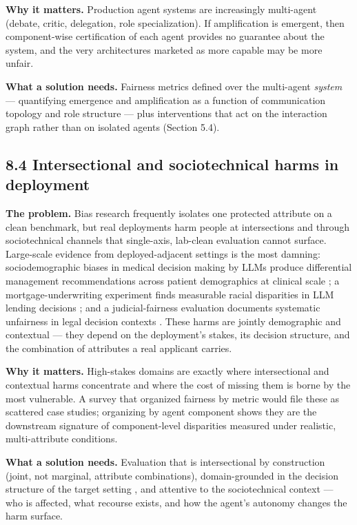 \documentclass[sigconf,nonacm]{acmart}
\begin{document}
\textbf{Why it matters.} Production agent systems are increasingly multi-agent (debate, critic, delegation, role specialization). If amplification is emergent, then component-wise certification of each agent provides no guarantee about the system, and the very architectures marketed as more capable may be more unfair.

\textbf{What a solution needs.} Fairness metrics defined over the multi-agent \emph{system} — quantifying emergence and amplification as a function of communication topology and role structure \cite{madigan2025emergent,nguyen2025social} — plus interventions that act on the interaction graph rather than on isolated agents (Section 5.4).

\subsection{8.4 Intersectional and sociotechnical harms in deployment}

\textbf{The problem.} Bias research frequently isolates one protected attribute on a clean benchmark, but real deployments harm people at intersections and through sociotechnical channels that single-axis, lab-clean evaluation cannot surface. Large-scale evidence from deployed-adjacent settings is the most damning: sociodemographic biases in medical decision making by LLMs produce differential management recommendations across patient demographics at clinical scale \cite{omar2025sociodemographic}; a mortgage-underwriting experiment finds measurable racial disparities in LLM lending decisions \cite{bowen2024measuring}; and a judicial-fairness evaluation documents systematic unfairness in legal decision contexts \cite{hu2025llms}. These harms are jointly demographic and contextual — they depend on the deployment's stakes, its decision structure, and the combination of attributes a real applicant carries.

\textbf{Why it matters.} High-stakes domains are exactly where intersectional and contextual harms concentrate and where the cost of missing them is borne by the most vulnerable. A survey that organized fairness by metric would file these as scattered case studies; organizing by agent component shows they are the downstream signature of component-level disparities measured under realistic, multi-attribute conditions.

\textbf{What a solution needs.} Evaluation that is intersectional by construction (joint, not marginal, attribute combinations), domain-grounded in the decision structure of the target setting \cite{omar2025sociodemographic,bowen2024measuring,hu2025llms}, and attentive to the sociotechnical context — who is affected, what recourse exists, and how the agent's autonomy changes the harm surface.
\end{document}
